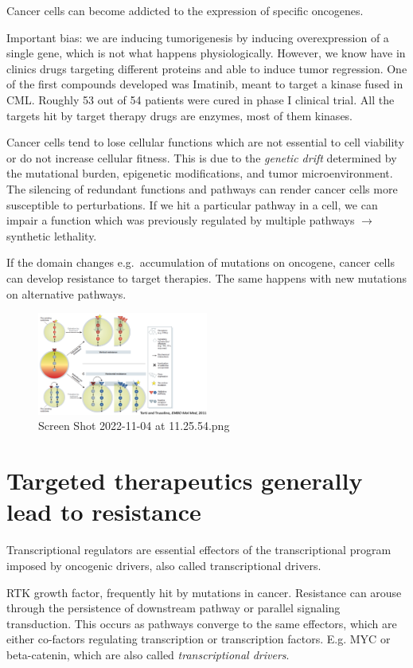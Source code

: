 Cancer cells can become addicted to the expression of specific oncogenes.

Important bias: we are inducing tumorigenesis by inducing overexpression of a single gene, which is not what happens physiologically. However, we know have in clinics drugs targeting different proteins and able to induce tumor regression. One of the first compounds developed was Imatinib, meant to target a kinase fused in CML. Roughly 53 out of 54 patients were cured in phase I clinical trial. All the targets hit by target therapy drugs are enzymes, most of them kinases.

Cancer cells tend to lose cellular functions which are not essential to cell viability or do not increase cellular fitness. This is due to the \emph{genetic drift} determined by the mutational burden, epigenetic modifications, and tumor microenvironment. The silencing of redundant functions and pathways can render cancer cells more susceptible to perturbations. If we hit a particular pathway in a cell, we can impair a function which was previously regulated by multiple pathways $\rightarrow$ synthetic lethality.

If the domain changes e.g.~accumulation of mutations on oncogene, cancer cells can develop resistance to target therapies. The same happens with new mutations on alternative pathways.

\begin{figure}
\centering
\includegraphics[width=0.5\textwidth]{../_resources/Screen_Shot_2022-11-04_at_11-25-54.png}
\caption{Screen Shot 2022-11-04 at 11.25.54.png}
\end{figure}

\section{Targeted therapeutics generally lead to resistance}

Transcriptional regulators are essential effectors of the transcriptional program imposed by oncogenic drivers, also called transcriptional drivers.

RTK growth factor, frequently hit by mutations in cancer. Resistance can arouse through the persistence of downstream pathway or parallel signaling transduction. This occurs as pathways converge to the same effectors, which are either co-factors regulating transcription or transcription factors. E.g. MYC or beta-catenin, which are also called \emph{transcriptional drivers}.

